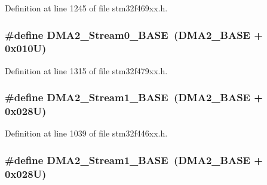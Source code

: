 Definition at line 1245 of file stm32f469xx.\+h.

\subsubsection[{\texorpdfstring{D\+M\+A2\+\_\+\+Stream0\+\_\+\+B\+A\+SE}{DMA2_Stream0_BASE}}]{\setlength{\rightskip}{0pt plus 5cm}\#define D\+M\+A2\+\_\+\+Stream0\+\_\+\+B\+A\+SE~({\bf D\+M\+A2\+\_\+\+B\+A\+SE} + 0x010\+U)}\hypertarget{group___peripheral__memory__map_gac4c67b24726ba6b94d03adb351bcec4d}{}\label{group___peripheral__memory__map_gac4c67b24726ba6b94d03adb351bcec4d}


Definition at line 1315 of file stm32f479xx.\+h.

\subsubsection[{\texorpdfstring{D\+M\+A2\+\_\+\+Stream1\+\_\+\+B\+A\+SE}{DMA2_Stream1_BASE}}]{\setlength{\rightskip}{0pt plus 5cm}\#define D\+M\+A2\+\_\+\+Stream1\+\_\+\+B\+A\+SE~({\bf D\+M\+A2\+\_\+\+B\+A\+SE} + 0x028\+U)}\hypertarget{group___peripheral__memory__map_ga35512bdc3f5e9df4557c2fbe7935d0b1}{}\label{group___peripheral__memory__map_ga35512bdc3f5e9df4557c2fbe7935d0b1}


Definition at line 1039 of file stm32f446xx.\+h.

\subsubsection[{\texorpdfstring{D\+M\+A2\+\_\+\+Stream1\+\_\+\+B\+A\+SE}{DMA2_Stream1_BASE}}]{\setlength{\rightskip}{0pt plus 5cm}\#define D\+M\+A2\+\_\+\+Stream1\+\_\+\+B\+A\+SE~({\bf D\+M\+A2\+\_\+\+B\+A\+SE} + 0x028\+U)}\hypertarget{group___peripheral__memory__map_ga35512bdc3f5e9df4557c2fbe7935d0b1}{}\label{group___peripheral__memory__map_ga35512bdc3f5e9df4557c2fbe7935d0b1}


